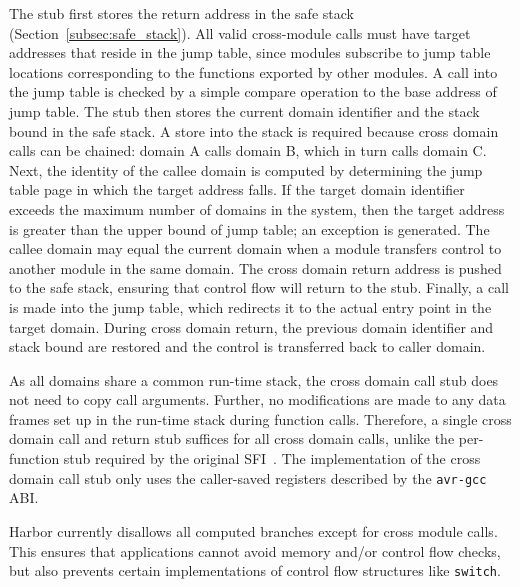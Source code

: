 The stub first stores the return address in the safe stack (Section~\ref{subsec:safe_stack}).
%
%
All valid cross-module calls must have target addresses that reside in the
jump table, since
%
modules subscribe to jump table locations
corresponding to the functions exported by other modules.
%
A call into the jump table is checked by a simple compare operation to
the base address of jump table.
%
%
The stub then stores the current domain identifier and the stack bound
in the safe stack.
%
A store into the stack is required because cross domain calls can be
chained: domain A calls domain B, which in turn calls domain C.
%
Next, the identity of the callee domain is computed by determining
the jump table page in which the target address falls.
%
%
If the target domain identifier exceeds the maximum number of domains
in the system, then the target address is greater
than the upper bound of jump table; an exception is generated.
%
The callee domain may equal the current domain when a module transfers
control to another module in the same domain.
%
The cross domain return address is pushed to the safe stack, ensuring that
%
control flow will return to the stub.
%
Finally, a call is made into the jump table, which redirects it to the
actual entry point in the target domain.
%
During cross domain return, the previous domain identifier and stack
bound are restored and the control is transferred back to caller
domain.
%

As all domains share a common run-time stack, the cross
domain call stub does not need to copy call arguments.
%
Further, no modifications are made to any data frames set up in the run-time
stack during function calls.
%
Therefore, a single cross domain call and return stub suffices for
all cross domain calls, unlike the per-function stub required by the
original SFI~\cite{wahbe93sfi}.
%
The implementation of the cross domain call stub only uses the
caller-saved registers described by the \texttt{avr-gcc} ABI.
%

Harbor currently disallows all computed branches except for cross
module calls.  This ensures that applications cannot avoid memory and/or
control flow checks, but also prevents certain implementations of control
flow structures like \texttt{switch}.


